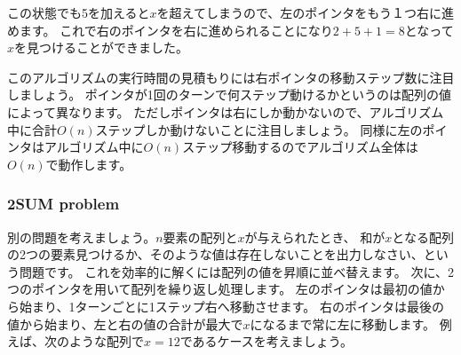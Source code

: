 この状態でも5を加えると$x$を超えてしまうので、左のポインタをもう１つ右に進めます。
これで右のポインタを右に進められることになり$2+5+1=8$となって$x$を見つけることができました。

\begin{center}
\end{center}

このアルゴリズムの実行時間の見積もりには右ポインタの移動ステップ数に注目しましょう。
ポインタが1回のターンで何ステップ動けるかというのは配列の値によって異なります。
ただしポインタは右にしか動かないので、アルゴリズム中に合計$O(n)$ステップしか動けないことに注目しましょう。
同様に左のポインタはアルゴリズム中に$O(n)$ステップ移動するのでアルゴリズム全体は$O(n)$で動作します。

\subsubsection{2SUM problem}


別の問題を考えましょう。$n$要素の配列と$x$が与えられたとき、
和が$x$となる配列の2つの要素見つけるか、そのような値は存在しないことを出力しなさい、という問題です。
これを効率的に解くには配列の値を昇順に並べ替えます。
次に、2つのポインタを用いて配列を繰り返し処理します。
左のポインタは最初の値から始まり、1ターンごとに1ステップ右へ移動させます。
右のポインタは最後の値から始まり、左と右の値の合計が最大で$x$になるまで常に左に移動します。
例えば、次のような配列で$x=12$であるケースを考えましょう。

\begin{center}
\end{center}

